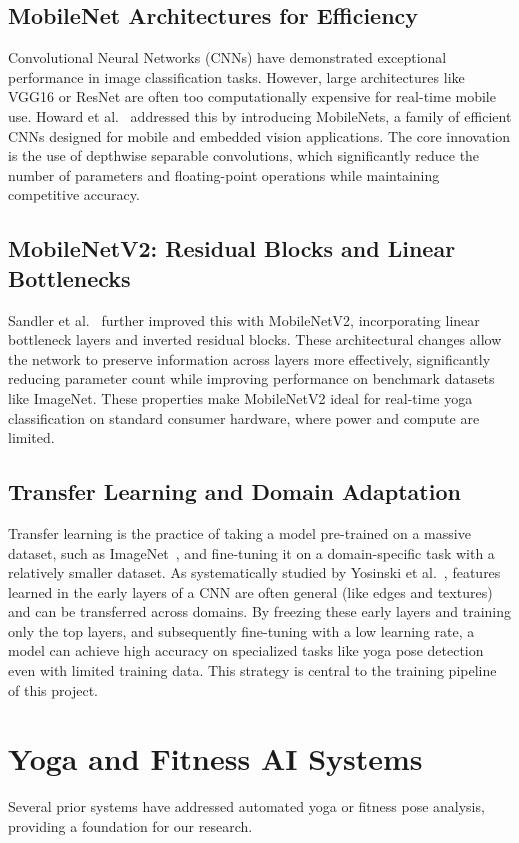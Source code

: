 \subsection{MobileNet Architectures for Efficiency}
Convolutional Neural Networks (CNNs) have demonstrated exceptional performance in image classification tasks. However, large architectures like VGG16 or ResNet are often too computationally expensive for real-time mobile use. Howard et al.~\cite{howard2017mobilenets} addressed this by introducing MobileNets, a family of efficient CNNs designed for mobile and embedded vision applications. The core innovation is the use of depthwise separable convolutions, which significantly reduce the number of parameters and floating-point operations while maintaining competitive accuracy.

\subsection{MobileNetV2: Residual Blocks and Linear Bottlenecks}
Sandler et al.~\cite{sandler2018mobilenetv2} further improved this with MobileNetV2, incorporating linear bottleneck layers and inverted residual blocks. These architectural changes allow the network to preserve information across layers more effectively, significantly reducing parameter count while improving performance on benchmark datasets like ImageNet. These properties make MobileNetV2 ideal for real-time yoga classification on standard consumer hardware, where power and compute are limited.

\subsection{Transfer Learning and Domain Adaptation}
Transfer learning is the practice of taking a model pre-trained on a massive dataset, such as ImageNet~\cite{deng2009imagenet}, and fine-tuning it on a domain-specific task with a relatively smaller dataset. As systematically studied by Yosinski et al.~\cite{yosinski2014transferable}, features learned in the early layers of a CNN are often general (like edges and textures) and can be transferred across domains. By freezing these early layers and training only the top layers, and subsequently fine-tuning with a low learning rate, a model can achieve high accuracy on specialized tasks like yoga pose detection even with limited training data. This strategy is central to the training pipeline of this project.

\section{Yoga and Fitness AI Systems}
Several prior systems have addressed automated yoga or fitness pose analysis, providing a foundation for our research.

